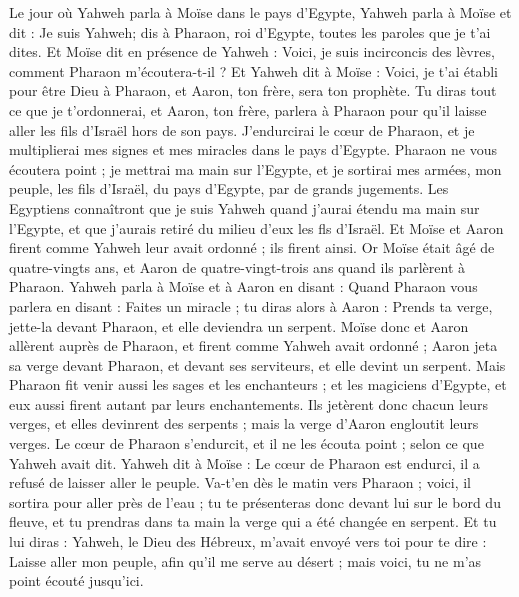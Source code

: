 \begin{multicols}{2}
Le jour où Yahweh parla à Moïse dans le pays d'Egypte,
Yahweh parla à Moïse et dit : Je suis Yahweh; dis à Pharaon, roi d'Egypte, toutes les paroles que je t'ai dites.
Et Moïse dit en présence de Yahweh : Voici, je suis incirconcis des lèvres, comment Pharaon m'écoutera-t-il ?
\VerseOne{}Et Yahweh dit à Moïse : Voici, je t'ai établi pour être Dieu à Pharaon, et Aaron, ton frère, sera ton prophète.
Tu diras tout ce que je t’ordonnerai, et Aaron, ton frère, parlera à Pharaon pour qu'il laisse aller les fils d'Israël hors de son pays.
J'endurcirai le cœur de Pharaon, et je multiplierai mes signes et mes miracles dans le pays d'Egypte.
Pharaon ne vous écoutera point ; je mettrai ma main sur l'Egypte, et je sortirai mes armées, mon peuple, les fils d'Israël, du pays d'Egypte, par de grands jugements.
Les Egyptiens connaîtront que je suis Yahweh quand j'aurai étendu ma main sur l'Egypte, et que j'aurais retiré du milieu d'eux les fls d'Israël.
Et Moïse et Aaron firent comme Yahweh leur avait ordonné ; ils firent ainsi.
Or Moïse était âgé de quatre-vingts ans, et Aaron de quatre-vingt-trois ans quand ils parlèrent à Pharaon.
Yahweh parla à Moïse et à Aaron en disant :
Quand Pharaon vous parlera en disant : Faites un miracle ; tu diras alors à Aaron : Prends ta verge, jette-la devant Pharaon, et elle deviendra un serpent.
Moïse donc et Aaron allèrent auprès de Pharaon, et firent comme Yahweh avait ordonné ; Aaron jeta sa verge devant Pharaon, et devant ses serviteurs, et elle devint un serpent.
Mais Pharaon fit venir aussi les sages et les enchanteurs ; et les magiciens d'Egypte, et eux aussi firent autant par leurs enchantements.
Ils jetèrent donc chacun leurs verges, et elles devinrent des serpents ; mais la verge d'Aaron engloutit leurs verges.
Le cœur de Pharaon s'endurcit, et il ne les écouta point ; selon ce que Yahweh avait dit.
Yahweh dit à Moïse : Le cœur de Pharaon est endurci, il a refusé de laisser aller le peuple.
Va-t'en dès le matin vers Pharaon ; voici, il sortira pour aller près de l'eau ; tu te présenteras donc devant lui sur le bord du fleuve, et tu prendras dans ta main la verge qui a été changée en serpent.
Et tu lui diras : Yahweh, le Dieu des Hébreux, m'avait envoyé vers toi pour te dire : Laisse aller mon peuple, afin qu'il me serve au désert ; mais voici, tu ne m'as point écouté jusqu’ici.

\end{multicols}
